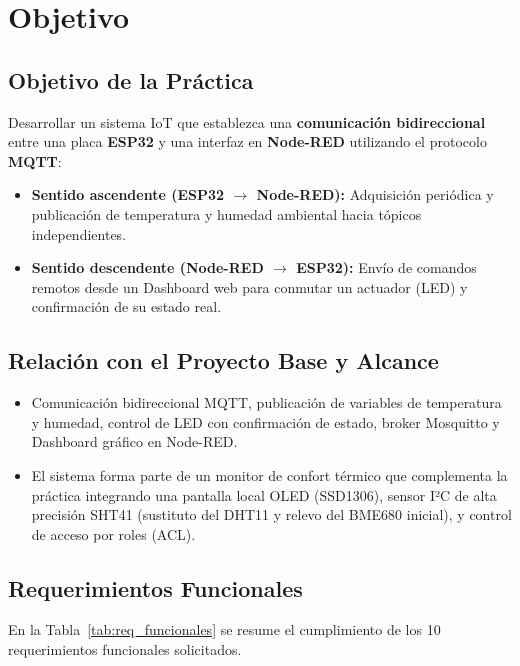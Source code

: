 \section{Objetivo}

\subsection{Objetivo de la Práctica}
Desarrollar un sistema IoT que establezca una \textbf{comunicación bidireccional} entre una placa \textbf{ESP32} y una interfaz en \textbf{Node-RED} utilizando el protocolo \textbf{MQTT}:
\begin{itemize}[noitemsep]
    \item \textbf{Sentido ascendente (ESP32 $\to$ Node-RED):} Adquisición periódica y publicación de temperatura y humedad ambiental hacia tópicos independientes.
    \item \textbf{Sentido descendente (Node-RED $\to$ ESP32):} Envío de comandos remotos desde un Dashboard web para conmutar un actuador (LED) y confirmación de su estado real.
\end{itemize}

\subsection{Relación con el Proyecto Base y Alcance}
\begin{itemize}[noitemsep]
    \item \practicaBadge Comunicación bidireccional MQTT, publicación de variables de temperatura y humedad, control de LED con confirmación de estado, broker Mosquitto y Dashboard gráfico en Node-RED.
    \item \proyectoBadge El sistema forma parte de un monitor de confort térmico que complementa la práctica integrando una pantalla local OLED (SSD1306), sensor I²C de alta precisión SHT41 (sustituto del DHT11 y relevo del BME680 inicial), y control de acceso por roles (ACL).
\end{itemize}

\subsection{Requerimientos Funcionales}
En la Tabla~\ref{tab:req_funcionales} se resume el cumplimiento de los 10 requerimientos funcionales solicitados.

